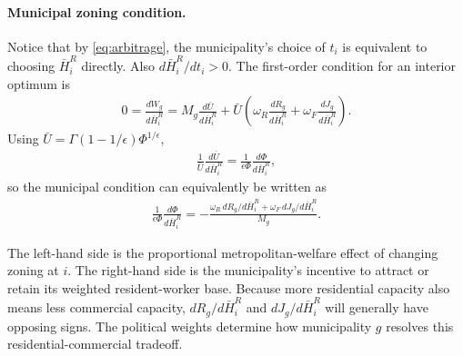 \documentclass[12pt, a4paper]{article}
\theoremstyle{definition}
\theoremstyle{remark}
\begin{document}
\paragraph{Municipal zoning condition.}
Notice that by \eqref{eq:arbitrage}, the municipality's choice of $t_i$ is equivalent to choosing $\bar H_i^R$ directly. Also $d\bar{H}_{i}^R/dt_i > 0$. The first-order condition for an interior optimum is
\begin{align}
    0
    =
    \frac{dW_g}{d\bar H_i^R}
    =
    M_g\frac{d\bar U}{d\bar H_i^R}
    +
    \bar U
    \left(
    \omega_R\frac{dR_g}{d\bar H_i^R}
    +
    \omega_F\frac{dJ_g}{d\bar H_i^R}
    \right).
    \label{eq:municipal-foc}
\end{align}
Using $\bar U=\Gamma(1-1/\epsilon)\Phi^{1/\epsilon}$,
\begin{align}
    \frac{1}{\bar U}\frac{d\bar U}{d\bar H_i^R}
    =
    \frac{1}{\epsilon\Phi}\frac{d\Phi}{d\bar H_i^R},
\end{align}
so the municipal condition can equivalently be written as
\begin{align}
    \label{eq:municipal-foc-phi}
    \frac{1}{\epsilon\Phi}\frac{d\Phi}{d\bar H_i^R}
    =
    -
    \frac{
    \omega_R\,dR_g/d\bar H_i^R
    +
    \omega_F\,dJ_g/d\bar H_i^R
    }{M_g}.
\end{align}

The left-hand side is the proportional metropolitan-welfare effect of changing zoning at $i$. The right-hand side is the municipality's incentive to attract or retain its weighted resident-worker base. Because more residential capacity also means less commercial capacity, $dR_g/d\bar H_i^R$ and $dJ_g/d\bar H_i^R$ will generally have opposing signs. The political weights determine how municipality $g$ resolves this residential-commercial tradeoff.

\end{document}

